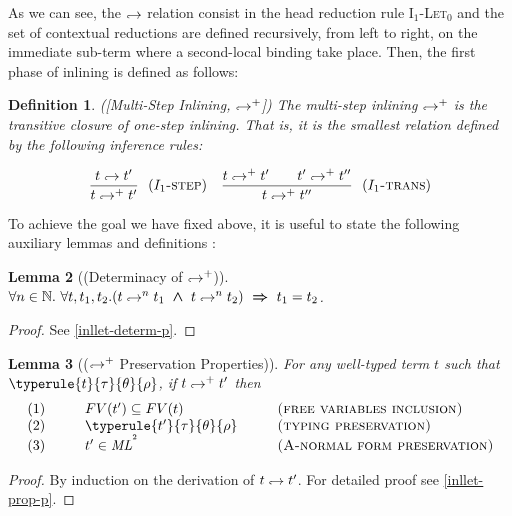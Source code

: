 \documentclass[a4paper,11pt,oneside]{article}
\theoremstyle{plain}
\newtheorem{definition}{Definition}[subsection]
\newtheorem{lemma}[definition]{Lemma}
\newcommand{\bwedge}{\boldsymbol{~\wedge~}}
\newcommand{\brarr}{\boldsymbol{~\Rightarrow~}}
\newcommand{\inlsrc}{\textit{ML}^{^2}}
\newcommand{\inlT}{\inlsrc}
\newcommand{\hookdownarrow}{\mathrel{\rotatebox[origin=c]{180}{$\hookleftarrow$}}}
\newcommand{\inlletarr}{\hookdownarrow}
\newcommand{\inlletplus}{\hookdownarrow^{+}}
\newcommand{\inllet}[2]{#1 \hookdownarrow #2}
\newcommand{\inllett}[2]{#1 \inlletplus #2}
\newcommand{\ilarr}{\hookdownarrow}
\begin{document}
As we can see, the $\ilarr$ relation consist in the head reduction rule
\textsc{I$_1$-Let$_0$} and the set of contextual reductions are defined
recursively, from left to right, on the immediate sub-term where a
second-local binding take place. Then, the first phase of inlining is
defined as follows:

\begin{definition}([Multi-Step Inlining, $\inlletplus$]) The multi-step
  inlining $\inlletplus$ is the transitive closure of one-step
  inlining. That is, it is the smallest relation defined by the following
  inference rules:


$$\dfrac{\inllet{t}{t'}}{\inllett{t}{t'}}{~~(\textsc{$I_1$-step})}
\quad\dfrac{\inllett{t}{t'} 
\qquad \inllett{t'}{t''}}{\inllett{t}{t''}}{~~(\textsc{$I_1$-trans})}$$
\end{definition}

To achieve the goal we have fixed above, it is useful to state the following
auxiliary lemmas and definitions :

\begin{lemma}[(Determinacy of $\inlletplus$)] 
	$\forall n \in \mathbb{N}.~ \forall t, t_1, t_2.
		(t \inlletarr^{n} {t_1} \bwedge t \inlletarr^{n} {t_2}) \brarr
			t_1 = t_2$.	\label{inllet-determ-l}	
\end{lemma}
\begin{proof} See \ref{inllet-determ-p}. \end{proof}

\begin{lemma}[($\inlletplus$ Preservation Properties)]
For any well-typed term $t$ such that\\ $\typerule{t}{\tau}{\theta}{\rho}$, if $\inllett{t}{t'}$ then
\begin{displaymath}
\begin{array}{l@{\hspace*{1cm}}l@{\hspace*{1cm}}l}
	(1)& FV(t') \subseteq FV(t) & \textsc{(free variables inclusion)} \\
	(2)& \typerule{t'}{\tau}{\theta}{\rho} &\textsc{(typing preservation)} \\
	(3)& t' \in \inlT & \textsc{(A-normal form preservation)}
\end{array}
\end{displaymath}
 \label{inllet-prop-l}
\end{lemma}
\begin{proof}
 By induction on the derivation of $\inllet{t}{t'}$. For detailed proof see
 \ref{inllet-prop-p}.
 \end{proof}
\end{document}
